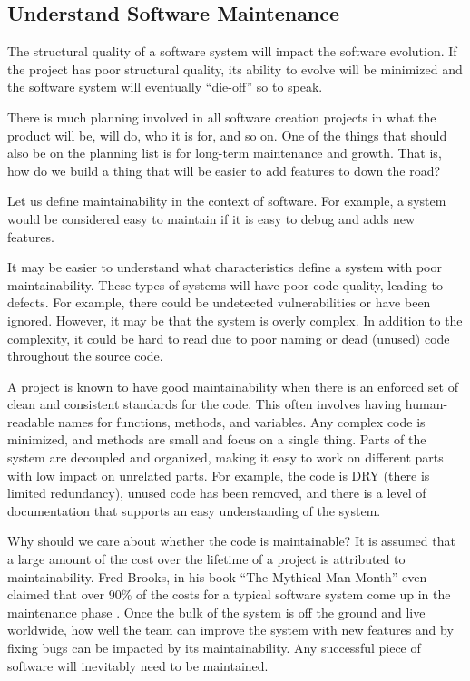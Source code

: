 \documentclass[12pt,conference]{IEEEtran}
\begin{document}
\subsection{Understand Software Maintenance}

The structural quality of a software system will impact the software evolution. If the project has poor structural quality, its ability to evolve will be minimized and the software system will eventually ``die-off'' so to speak.

There is much planning involved in all software creation projects in what the product will be, will do, who it is for, and so on. One of the things that should also be on the planning list is for long-term maintenance and growth. That is, how do we build a thing that will be easier to add features to down the road?

Let us define maintainability in the context of software. For example, a system would be considered easy to maintain if it is easy to debug and adds new features.

It may be easier to understand what characteristics define a system with poor maintainability. These types of systems will have poor code quality, leading to defects. For example, there could be undetected vulnerabilities or have been ignored. However, it may be that the system is overly complex. In addition to the complexity, it could be hard to read due to poor naming or dead (unused) code throughout the source code.

A project is known to have good maintainability when there is an enforced set of clean and consistent standards for the code. This often involves having human-readable names for functions, methods, and variables. Any complex code is minimized, and methods are small and focus on a single thing. Parts of the system are decoupled and organized, making it easy to work on different parts with low impact on unrelated parts. For example, the code is DRY (there is limited redundancy), unused code has been removed, and there is a level of documentation that supports an easy understanding of the system.

Why should we care about whether the code is maintainable? It is assumed that a large amount of the cost over the lifetime of a project is attributed to maintainability. Fred Brooks, in his book ``The Mythical Man-Month'' even claimed that over 90\% of the costs for a typical software system come up in the maintenance phase \cite{brooks:mythical}. Once the bulk of the system is off the ground and live worldwide, how well the team can improve the system with new features and by fixing bugs can be impacted by its maintainability. Any successful piece of software will inevitably need to be maintained.
\end{document}

